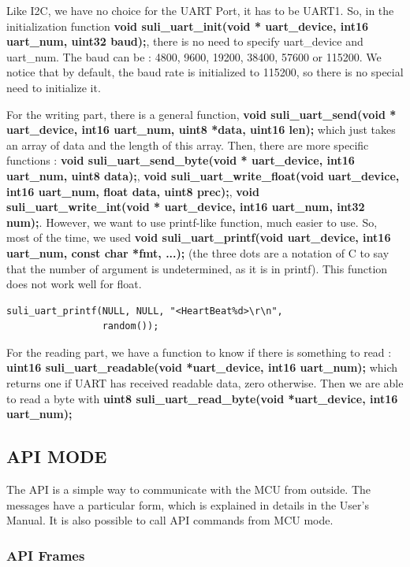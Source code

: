 Like I2C, we have no choice for the UART Port, it has to be UART1. So, in the initialization function \textbf{void suli\_uart\_init(void * uart\_device, int16 uart\_num, uint32 baud);}, there is no need to specify uart\_device and uart\_num. The baud can be : 4800, 9600, 19200, 38400, 57600 or 115200. We notice that by default, the baud rate is initialized to 115200, so there is no special need to initialize it.

For the writing part, there is a general function, \textbf{void suli\_uart\_send(void * uart\_device, int16 uart\_num, uint8 *data, uint16 len);} which just takes an array of data and the length of this array. Then, there are more specific functions : \textbf{void suli\_uart\_send\_byte(void * uart\_device, int16 uart\_num, uint8 data);}, \textbf{void suli\_uart\_write\_float(void uart\_device, int16 uart\_num, float data, uint8 prec);}, \textbf{void suli\_uart\_write\_int(void * uart\_device, int16 uart\_num, int32 num);}. However, we want to use printf-like function, much easier to use. So, most of the time, we used \textbf{void suli\_uart\_printf(void uart\_device, int16 uart\_num, const char *fmt, ...);} (the three dots are a notation of C to say that the number of argument is undetermined, as it is in printf). This function does not work well for float.

\begin{lstlisting}[frame=single]
suli_uart_printf(NULL, NULL, "<HeartBeat%d>\r\n",
                 random());
\end{lstlisting}

For the reading part, we have a function to know if there is something to read : \textbf{uint16 suli\_uart\_readable(void *uart\_device, int16 uart\_num);} which returns one if UART has received readable data, zero otherwise. Then we are able to read a byte with \textbf{uint8 suli\_uart\_read\_byte(void *uart\_device, int16 uart\_num);}

\subsection{API MODE}

The API is a simple way to communicate with the MCU from outside. The messages have a particular form, which is explained in details in the User's Manual. It is also possible to call API commands from MCU mode.

\subsubsection{API Frames}

